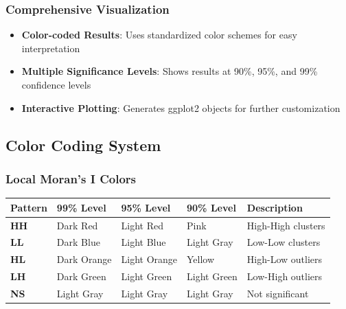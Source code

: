 \documentclass{article}
\begin{document}
\subsubsection{Comprehensive Visualization}
\begin{itemize}
    \item \textbf{Color-coded Results}: Uses standardized color schemes for easy interpretation
    \item \textbf{Multiple Significance Levels}: Shows results at 90\%, 95\%, and 99\% confidence levels
    \item \textbf{Interactive Plotting}: Generates ggplot2 objects for further customization
\end{itemize}

\subsection{Color Coding System}

\subsubsection{Local Moran's I Colors}
\begin{longtable}{p{3cm}p{2cm}p{2cm}p{2cm}p{5cm}}
\toprule
\textbf{Pattern} & \textbf{99\% Level} & \textbf{95\% Level} & \textbf{90\% Level} & \textbf{Description} \\
\midrule
\textbf{HH} & Dark Red & Light Red & Pink & High-High clusters \\
\textbf{LL} & Dark Blue & Light Blue & Light Gray & Low-Low clusters \\
\textbf{HL} & Dark Orange & Light Orange & Yellow & High-Low outliers \\
\textbf{LH} & Dark Green & Light Green & Light Green & Low-High outliers \\
\textbf{NS} & Light Gray & Light Gray & Light Gray & Not significant \\
\bottomrule
\end{longtable}
\end{document}
